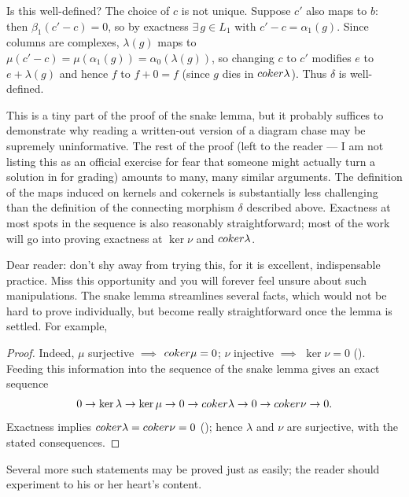 Is this well-defined? The choice of $c$ is not unique. Suppose $c'$
also maps to $b$: then $\beta_1(c' - c) = 0$, so by exactness
$\exists\, g \in L_1$ with $c' - c = \alpha_1(g)$. Since columns are
complexes, $\lambda(g)$ maps to
$\mu(c' - c) = \mu(\alpha_1(g)) = \alpha_0(\lambda(g))$, so changing
$c$ to $c'$ modifies $e$ to $e + \lambda(g)$ and hence $f$ to
$f + 0 = f$ (since $g$ dies in $coker\lambda$). Thus $\delta$ is
well-defined.

This is a tiny part of the proof of the snake lemma, but it probably
suffices to demonstrate why reading a written-out version of a diagram
chase may be supremely uninformative. The rest of the proof (left to
the reader — I am not listing this as an official exercise for fear
that someone might actually turn a solution in for grading) amounts to
many, many similar arguments. The definition of the maps induced on
kernels and cokernels is substantially less challenging than the
definition of the connecting morphism $\delta$ described
above. Exactness at most spots in the sequence is also reasonably
straightforward; most of the work will go into proving exactness at
$\ker\nu$ and $coker\lambda$.

Dear reader: don't shy away from trying this, for it is excellent,
indispensable practice. Miss this opportunity and you will forever
feel unsure about such manipulations.  The snake lemma streamlines
several facts, which would not be hard to prove individually, but
become really straightforward once the lemma is settled. For example,

\begin{coro}{}{}
\end{coro}

\begin{proof}
  Indeed, $\mu$ surjective $\implies$ $coker\mu = 0$; $\nu$ injective
  $\implies$ $\ker\nu = 0$
  (). Feeding this information into
  the sequence of the snake lemma gives an exact sequence
  \[0 \to \ker\lambda \to \ker\mu \to 0 \to coker\lambda \to 0 \to
    coker\nu \to 0.\] Exactness implies
  $coker\lambda = coker\nu = 0$
  (); hence
  $\lambda$ and $\nu$ are surjective, with the stated consequences.
\end{proof}

Several more such statements may be proved just as easily; the reader
should experiment to his or her heart's content.


